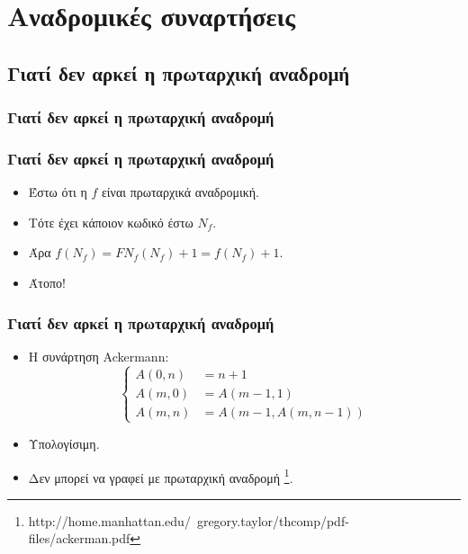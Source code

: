 \documentclass{beamer}
\begin{document}
\section{Αναδρομικές συναρτήσεις}

\subsection{Γιατί δεν αρκεί η πρωταρχική αναδρομή}

\begin{frame}
  \frametitle{Γιατί δεν αρκεί η πρωταρχική αναδρομή}
\end{frame}

\begin{frame}
  \frametitle{Γιατί δεν αρκεί η πρωταρχική αναδρομή}
  \begin{itemize}
  \item Έστω ότι η $f$ είναι πρωταρχικά αναδρομική.\pause
  \item Τότε έχει κάποιον κωδικό έστω $N_f$.\pause
  \item Άρα $f(N_f) = FN_f(N_f) + 1 = f(N_f) + 1$.\pause
  \item Άτοπο!
  \end{itemize}
\end{frame}

\begin{frame}
  \frametitle{Γιατί δεν αρκεί η πρωταρχική αναδρομή}
  \begin{itemize}
  \item Η συνάρτηση Ackermann:
    $$
    \left\{
    \begin{array}{ll}
      A(0,n) &= n+1\\
      A(m,0) &= A(m-1,1)\\
      A(m,n) &= A(m-1, A(m,n-1))
    \end{array}
    \right.
    $$
  \item Υπολογίσιμη.
  \item Δεν μπορεί να γραφεί με πρωταρχική αναδρομή 
    \footnote{
                        {http://home.manhattan.edu/~gregory.taylor/thcomp/pdf-files/ackerman.pdf}}.
  \end{itemize}
\end{frame}
\end{document}
